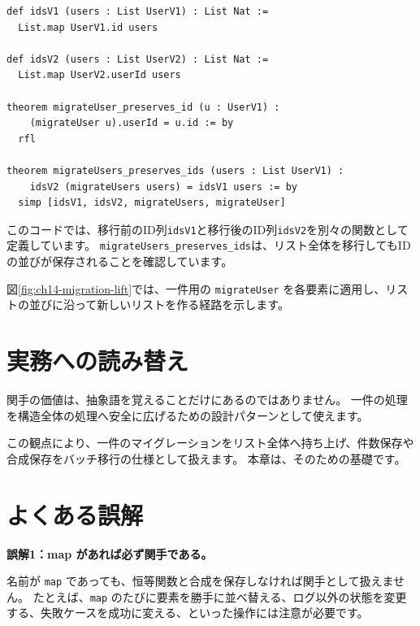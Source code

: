 \begin{listing}[htbp]
\begin{verbatim}
def idsV1 (users : List UserV1) : List Nat :=
  List.map UserV1.id users

def idsV2 (users : List UserV2) : List Nat :=
  List.map UserV2.userId users

theorem migrateUser_preserves_id (u : UserV1) :
    (migrateUser u).userId = u.id := by
  rfl

theorem migrateUsers_preserves_ids (users : List UserV1) :
    idsV2 (migrateUsers users) = idsV1 users := by
  simp [idsV1, idsV2, migrateUsers, migrateUser]
\end{verbatim}
\caption{\texttt{migrateUsers\_preserves\_ids}}
\label{lst:ch14_preserve_ids}
\end{listing}

このコードでは、移行前のID列\texttt{idsV1}と移行後のID列\texttt{idsV2}を別々の関数として定義しています。
\texttt{migrateUsers\_preserves\_ids}は、リスト全体を移行してもIDの並びが保存されることを確認しています。

図\ref{fig:ch14-migration-lift}では、一件用の \texttt{migrateUser} を各要素に適用し、リストの並びに沿って新しいリストを作る経路を示します。


\section{実務への読み替え}

関手の価値は、抽象語を覚えることだけにあるのではありません。
一件の処理を構造全体の処理へ安全に広げるための設計パターンとして使えます。

この観点により、一件のマイグレーションをリスト全体へ持ち上げ、件数保存や合成保存をバッチ移行の仕様として扱えます。
本章は、そのための基礎です。

\section{よくある誤解}

\textbf{誤解1：map があれば必ず関手である。}

名前が \texttt{map} であっても、恒等関数と合成を保存しなければ関手として扱えません。
たとえば、\texttt{map} のたびに要素を勝手に並べ替える、ログ以外の状態を変更する、失敗ケースを成功に変える、といった操作には注意が必要です。

